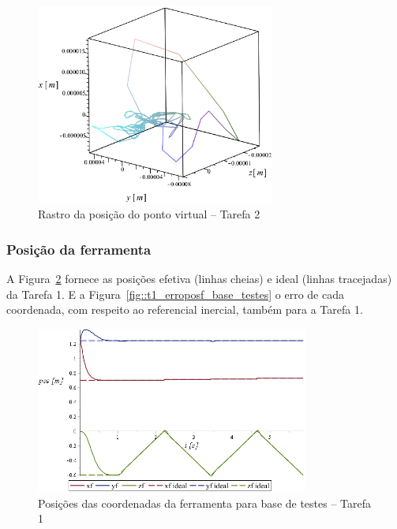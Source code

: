\begin{figure}[h!]
	\centering 
 	\includegraphics[width=0.70\textwidth]{figs/t2_pvirtural_base_testes}
 	\caption{Rastro da posição do ponto virtual -- Tarefa 2}
 	\label{fig::t2_pvirtural_base_testes}
\end{figure}


\subsubsection{Posição da ferramenta}

A Figura~\ref{fig::t1_posf_base_testes} fornece as posições efetiva (linhas
cheias) e ideal (linhas tracejadas) da Tarefa 1. E a
Figura~\ref{fig::t1_erroposf_base_testes} o erro de cada coordenada, com
respeito ao referencial inercial, também para a Tarefa 1.

\begin{figure}[h!]
	\centering 
 	\includegraphics[width=0.80\textwidth]{figs/t1_posf_base_testes}
 	\caption{Posições das coordenadas da ferramenta para base de testes -- Tarefa
 	1}
 	\label{fig::t1_posf_base_testes}
\end{figure}

